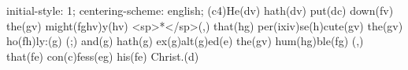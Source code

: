 initial-style: 1;
centering-scheme: english;
(c4)He(dv) hath(dv) put(dc) down(fv) the(gv) might(fghv)y(hv) <sp>*</sp>(,) that(hg) per(ixiv)se(h)cute(gv) the(gv) ho(fh)ly:(g) (;) and(g) hath(g) ex(g)alt(g)ed(e) the(gv) hum(hg)ble(fg) (,) that(fe) con(c)fess(eg) his(fe) Christ.(d)
